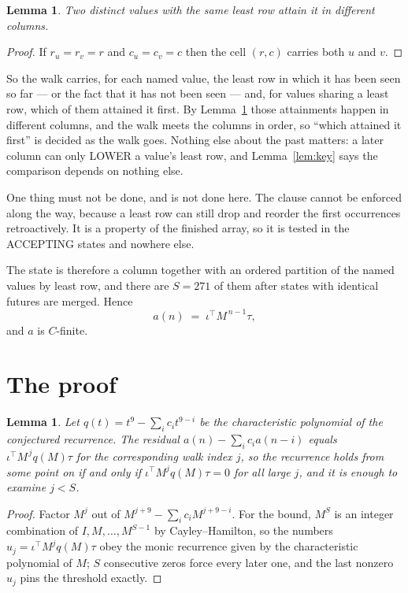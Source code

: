 \documentclass[11pt,a4paper]{article}
\theoremstyle{plain}
\newtheorem{lemma}[theorem]{Lemma}
\theoremstyle{definition}
\begin{document}
\begin{lemma}\label{lem:tie}
Two distinct values with the same least row attain it in different columns.
\end{lemma}

\begin{proof}
If $r_u=r_v=r$ and $c_u=c_v=c$ then the cell $(r,c)$ carries both $u$ and $v$.
\end{proof}

So the walk carries, for each named value, the least row in which it has been seen so far ---
or the fact that it has not been seen --- and, for values sharing a least row, which of them
attained it first. By Lemma~\ref{lem:tie} those attainments happen in different columns, and
the walk meets the columns in order, so ``which attained it first'' is decided as the walk
goes. Nothing else about the past matters: a later column can only LOWER a value's least row,
and Lemma~\ref{lem:key} says the comparison depends on nothing else.

One thing must not be done, and is not done here. The clause cannot be enforced along the way,
because a least row can still drop and reorder the first occurrences retroactively. It is a
property of the finished array, so it is tested in the ACCEPTING states and nowhere else.

The state is therefore a column together with an ordered partition of the named values by least
row, and there are $S=271$ of them after states with identical futures are merged. Hence
\[
a(n)\;=\;\iota^{\!\top}M^{\,n-1}\tau,
\]
and $a$ is $C$-finite.

\section{The proof}

\begin{lemma}\label{lem:crit}
Let $q(t)=t^{9}-\sum_i c_it^{9-i}$ be the characteristic polynomial of the
conjectured recurrence. The residual $a(n)-\sum_ic_ia(n-i)$ equals
$\iota^{\!\top}M^{\,j}q(M)\tau$ for the corresponding walk index $j$, so the recurrence
holds from some point on if and only if $\iota^{\!\top}M^{j}q(M)\tau=0$ for all large $j$,
and it is enough to examine $j<S$.
\end{lemma}

\begin{proof}
Factor $M^{j}$ out of $M^{j+9}-\sum_ic_iM^{j+9-i}$. For the bound, $M^{S}$
is an integer combination of $I,M,\dots,M^{S-1}$ by Cayley--Hamilton, so the numbers
$u_j=\iota^{\!\top}M^{j}q(M)\tau$ obey the monic recurrence given by the characteristic
polynomial of $M$; $S$ consecutive zeros force every later one, and the last nonzero $u_j$
pins the threshold exactly.
\end{proof}
\end{document}
